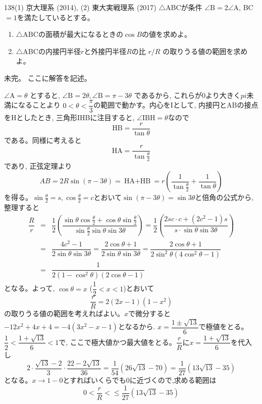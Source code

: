 \begin{thm}{138}{}{(1) 京大理系 (2014), (2) 東大実戦理系 (2017)}
 $\triangle$ABCが条件 $\angle{\mbox{B}}=2\angle{\mbox{A}}$, BC$=1$を満たしているとする。
 \begin{enumerate}
  \item $\triangle$ABCの面積が最大になるときの$\cos{B}$の値を求めよ。
  \item $\triangle$ABCの内接円半径$r$と外接円半径$R$の比 $r/R$ の取りうる値の範囲を求めよ。
 \end{enumerate}
\end{thm}
未完。
ここに解答を記述。

$\angle{\mbox{A}}=\theta$ とすると, $\angle{\mbox{B}}=2\theta, 　\angle{\mbox{B}}=\pi-3\theta$ であるから, これらが0より大きく$pi$未満になることより $0<\theta<\dfrac{\pi}{3}$の範囲で動かす。内心をIとして, 内接円とABの接点をHとしたとき, 三角形IHBに注目すると, $\angle{\mbox{IBH}}=\theta$なので
\[\mbox{HB}=\dfrac{r}{\tan{\theta}}\]
である。同様に考えると
\[\mbox{HA}=\dfrac{r}{\tan{\frac{\theta}{2}}}\]
であり, 正弦定理より
\[AB=2R\sin{ (\pi-3\theta) } =\mbox{HA$+$HB} =r\left( \dfrac{1}{ \tan{\frac{\theta}{2} }}+\dfrac{1}{\tan{\theta}}\right)\]
を得る。$\sin{\frac{\theta}{2}}=s, \cos{\frac{\theta}{2}}=c$とおいて$\sin{(\pi-3\theta)=\sin{3\theta}}$と倍角の公式から,整理すると
\begin{eqnarray*}
\dfrac{R}{r}&=&\dfrac{1}{2}\left( \dfrac{\sin{\theta}\cos{\frac{\theta}{2}}  +\cos{\theta}\sin{ \frac{\theta}{2} }  }{\sin{\frac{\theta}{2}}\sin{\theta}\sin{3\theta}}\right)=\dfrac{1}{2}\left( \dfrac{2sc\cdot c + (2c^2-1)s}{s\cdot \sin{\theta} \sin{3\theta}}\right)\\
&=&\dfrac{4c^2-1}{2\sin{\theta}\sin{3\theta}} = \dfrac{2\cos{\theta}+1}{2\sin{\theta}\sin{3\theta}}=\dfrac{2\cos{\theta}+1}{2\sin^2{\theta}(4\cos^2{\theta}-1)}\\
&=&\dfrac{1}{2(1-\cos^2{\theta})(2\cos{\theta}-1)}
\end{eqnarray*}
となる。よって, $\cos{\theta}=x$ ($\dfrac{1}{2}<x<1$)とおいて
\[\dfrac{r}{R}=2(2x-1)(1-x^2)\]
の取りうる値の範囲を考えればよい。$x$で微分すると $-12x^2+4x+4=-4(3x^2-x-1)$となるから. $x=\dfrac{1\pm \sqrt{13}}{6}$で極値をとる。$\dfrac{1}{2}<\dfrac{1+\sqrt{13}}{6}<1$で, ここで極大値かつ最大値をとる。$\dfrac{r}{R}$に$x=\dfrac{1+\sqrt{13}}{6}$を代入し
\[2\cdot\dfrac{\sqrt{13}-2}{3}\cdot\dfrac{22-2\sqrt{13}}{36} = \dfrac{1}{54}(26\sqrt{13} -70)=\dfrac{1}{27}(13\sqrt{13}-35)\]
となる。$x\to 1-0$とすればいくらでも0に近づくので,求める範囲は
\[0<\dfrac{r}{R}<\leq \dfrac{1}{27}(13\sqrt{13}-35)\]
